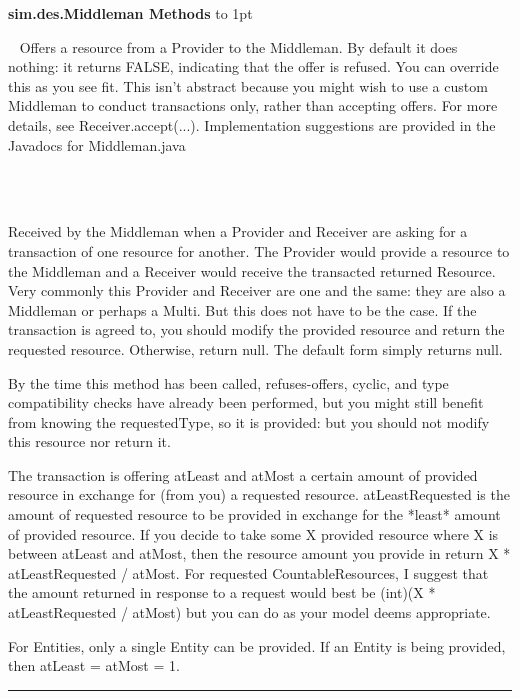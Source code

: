 \documentclass[twoside,10pt]{article}
\newcommand\class[1]{\index{Classes!{#1}}\textsf{#1}}
\newcommand\code[1]{\textsf{#1}}
\newcommand*{\xfill}[1][0pt]{%
	\cleaders
		\hbox to 1pt{\hss
			\raisebox{#1}{\rule{1.2pt}{0.4pt}}%
			\hss}\hfill}
\newenvironment{methods}[1]{
\vspace{1.0em}\noindent\textsf{\textbf{#1 Methods}}\quad \xfill[0.5ex]
\vspace{-0.25em}
\begin{description}
\small}
{\end{description}\hrule\vspace{1.5em}}
\newcommand{\mthd}[1]{\item[{\sf #1}]~\newline}
\begin{document}
\begin{methods}{\class{sim.des.Middleman}}
\mthd{public boolean accept(Provider provider, Resource resource, double atLeast, double atMost)}
Offers a resource from a Provider to the Middleman.  By default it does nothing: 
it returns FALSE, indicating that the offer is refused.   You can override this
as you see fit.  This isn't abstract because you might wish to use a custom 
Middleman to conduct transactions only, rather than accepting offers.  For more details, see Receiver.accept(...).  Implementation suggestions are provided in the Javadocs for Middleman.java
      
\mthd{protected Resource performTransaction(Provider provider, Receiver receiver, Resource provided, double atLeast,}
\rule{0pt}{0pt}\hspace{\fill}{\sf double atMost, Resource requestedType, double atLeastRequested)}\\
Received by the Middleman when a Provider and Receiver are asking for a transaction of one resource for another.  
    	The Provider would provide a resource to the Middleman and a Receiver would receive the transacted returned Resource.
    	Very commonly this Provider and Receiver are one and the same: they are also a Middleman or perhaps a Multi.
    	But this does not have to be the case.  	
		If the transaction is agreed to, you should modify the provided resource and return the requested resource.
		Otherwise, return null.  The default form simply returns null. 
		
By the time this method has been called, refuses-offers,
		cyclic, and type compatibility checks have already been performed, but you might still benefit from 
		knowing the requestedType, so it is provided: but you should not modify this resource nor return it.
				
The transaction is offering atLeast and atMost a certain amount of provided resource in exchange for
    	(from you) a requested resource.  atLeastRequested is the amount of requested resource to be provided
    	in exchange for the *least* amount of provided resource.  If you decide to take some X provided resource
    	where X is between atLeast and atMost, then the resource amount you provide in return 
	\code{X * atLeastRequested / atMost}.
    	For requested CountableResources, I suggest that the amount returned in response to a request would best be
    	\code{(int)(X * atLeastRequested / atMost)} but you can do as your model deems appropriate.
    	
For Entities, only a single Entity can be provided.  If an Entity is being provided, then atLeast = atMost = 1.
    	

\end{methods}
\end{document}
